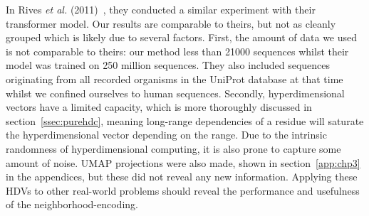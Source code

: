 In Rives \textit{et al.} (2011)~\cite{esm1}, they conducted a similar experiment with their transformer model. Our results are comparable to theirs, but not as cleanly grouped which is likely due to several factors. First, the amount of data we used is not comparable to theirs: our method less than 21000 sequences whilst their model was trained on 250 million sequences. They also included sequences originating from all recorded organisms in the UniProt database at that time whilst we confined ourselves to human sequences. Secondly, hyperdimensional vectors have a limited capacity, which is more thoroughly discussed in section~\ref{ssec:purehdc}, meaning long-range dependencies of a residue will saturate the hyperdimensional vector depending on the range. Due to the intrinsic randomness of hyperdimensional computing, it is also prone to capture some amount of noise. UMAP projections were also made, shown in section~\ref{app:chp3} in the appendices, but these did not reveal any new information. Applying these HDVs to other real-world problems should reveal the performance and usefulness of the neighborhood-encoding.